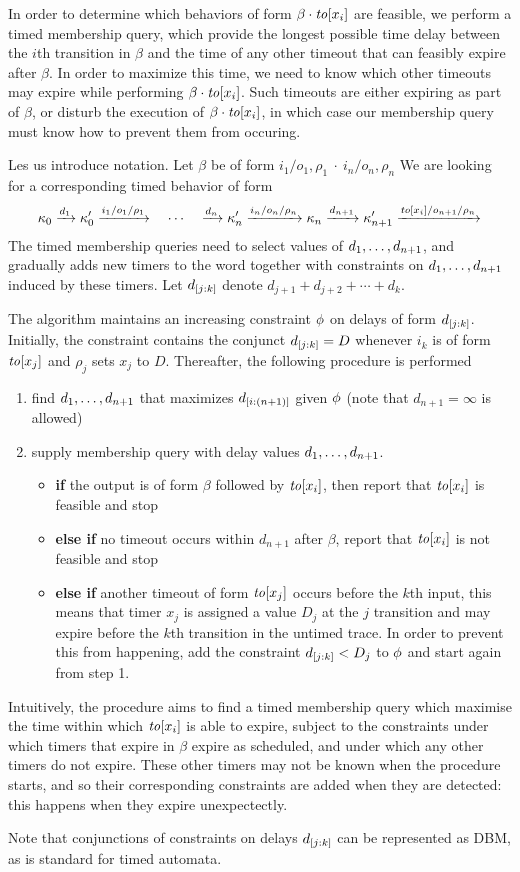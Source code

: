 In order to determine which behaviors of form $\beta \cdot \mathit{to}[x_i]$
are feasible, we perform a timed membership query, which provide the longest
possible time delay between the $i$th transition in $\beta$ and the time
of any other timeout that can feasibly expire after $\beta$. In order to
maximize this time, we need to know which other timeouts may expire while
performing $\beta \cdot \mathit{to}[x_i]$. Such timeouts are either expiring
as part of $\beta$, or disturb the execution of $\beta \cdot \mathit{to}[x_i]$,
in which case our membership query must know how to prevent them from occuring.

Les us introduce notation. Let $\beta$ be of form
\(
  {i_1/o_1, \rho_1} \ \cdot \ {i_n/o_n, \rho_n}
\)
We are looking for a corresponding timed behavior of form 
\[
\kappa_0 \xrightarrow{d_1} \kappa'_0 \xrightarrow{i_1/o_1/\rho_1}
\quad \cdots \quad
\xrightarrow{d_n} \kappa'_n \xrightarrow{i_n/o_n/\rho_n} \kappa_n
\xrightarrow{d_{n+1}} \kappa'_{n+1} \xrightarrow{\mathit{to}[x_i]/o_{n+1}/\rho_n}
\]
The timed membership queries need to select values
of ${d}_1 , \ldots , {d}_{n+1}$, and gradually adds new timers to the word together
with constraints on ${d}_1 , \ldots , {d}_{n+1}$ induced by these timers.
Let $d_{[j:k]}$ denote $d_{j+1} + d_{j+2} + \cdots + d_k$.

The algorithm maintains an increasing constraint $\phi$ on delays of form
$d_{[j:k]}$. Initially, the constraint contains the conjunct
$d_{[j:k]} = D$ whenever $i_k$ is of form $\mathit{to}[x_j]$ and
$\rho_j$ sets $x_j$ to $D$.
Thereafter, the following procedure is performed
  \begin{enumerate}
  \item
    find ${d}_1 , \ldots , {d}_{{n+1}}$ that maximizes $d_{[i:(n+1)]}$ given
    $\phi$ (note that $d_{n+1} = \infty$ is allowed)
  \item
    supply membership query with delay values ${d}_1 , \ldots , {d}_{{n+1}}$.
\begin{itemize}
  \item
    {\bf if} the output is of form $\beta$ followed by $\mathit{to}[x_i]$, then
    report that $\mathit{to}[x_i]$ is feasible and stop
  \item
    {\bf else if} no timeout occurs within $d_{n+1}$ after $\beta$, report
    that $\mathit{to}[x_i]$ is not feasible and stop
  \item
    {\bf else if} another timeout of form $\mathit{to}[x_j]$ occurs before
    the $k$th input, this means that timer $x_j$ is assigned a value
    $D_j$ at the $j$ transition and may expire before the $k$th transition
    in the untimed trace. In order to prevent this from happening,
    add the constraint $d_{[j:k]} < D_j$ to $\phi$ and start again
    from step 1.
\end{itemize}
  \end{enumerate}
  Intuitively, the procedure aims to find a timed membership query which maximise
  the time within which $\mathit{to}[x_i]$ is able to expire,
  subject to the constraints under which timers that expire in $\beta$ expire
  as scheduled, and under which any other timers do not expire. These
  other timers may not be known when the procedure starts, and so their
  corresponding constraints are added when they are detected: this happens
  when they expire unexpectectly.

  Note that conjunctions of constraints on delays $d_{[j:k]}$ can be represented as DBM, as is standard for timed automata.




